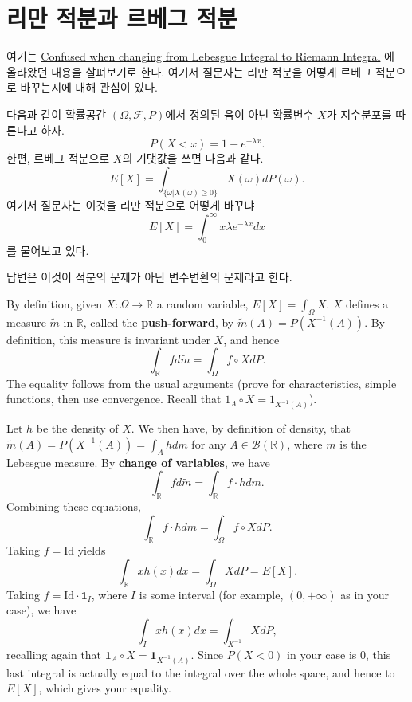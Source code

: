 \documentclass[
  13pt,
  letterpaper,
  DIV=11,
  numbers=noendperiod]{scrreprt}
\theoremstyle{definition}
\theoremstyle{plain}
\theoremstyle{definition}
\theoremstyle{plain}
\theoremstyle{plain}
\theoremstyle{definition}
\theoremstyle{remark}
\begin{document}
\section{리만 적분과 르베그
적분}\label{uxb9acuxb9cc-uxc801uxbd84uxacfc-uxb974uxbca0uxadf8-uxc801uxbd84}

여기는
\href{https://math.stackexchange.com/questions/2958787/confused-when-changing-from-lebesgue-integral-to-riemann-integral}{Confused
when changing from Lebesgue Integral to Riemann Integral} 에 올라왔던
내용을 살펴보기로 한다. 여기서 질문자는 리만 적분을 어떻게 르베그
적분으로 바꾸는지에 대해 관심이 있다.

다음과 같이 확률공간 \((\Omega, \mathcal{F}, P)\)에서 정의된 음이 아닌
확률변수 \(X\)가 지수분포를 따른다고 하자. \[
P(X<x) = 1-e^{-\lambda x}.
\] 한편, 르베그 적분으로 \(X\)의 기댓값을 쓰면 다음과 같다. \[
E[X] = \int_{\{\omega | X(\omega) \geq 0 \}} X(\omega) dP(\omega).
\] 여기서 질문자는 이것을 리만 적분으로 어떻게 바꾸냐 \[
E[X] = \int_0^\infty x \lambda e^{-\lambda x}dx
\] 를 물어보고 있다.

답변은 이것이 적분의 문제가 아닌 변수변환의 문제라고 한다.

By definition, given \(X: \Omega \rightarrow \mathbb{R}\) a random
variable, \(E[X] = \int_{\Omega} X\). \(X\) defines a measure
\(\tilde{m}\) in \(\mathbb{R}\), called the \textbf{push-forward}, by
\(\tilde{m}(A) = P(X^{-1}(A))\). By definition, this measure is
invariant under \(X\), and hence \[
\int_{\mathbb{R}} f d\tilde{m} = \int_{\Omega} f \circ X dP.
\] The equality follows from the usual arguments (prove for
characteristics, simple functions, then use convergence. Recall that
\(1_A \circ X = 1_{X^{-1}(A)}\)).

Let \(h\) be the density of \(X\). We then have, by definition of
density, that \(\tilde{m}(A) = P(X^{-1}(A)) = \int_A h dm\) for any
\(A \in \mathcal{B}(\mathbb{R})\), where \(m\) is the Lebesgue measure.
By \textbf{change of variables}, we have \[
\int_{\mathbb{R}}f d\tilde{m} = \int_{\mathbb{R}} f\cdot h dm.
\] Combining these equations, \[
\int_{\mathbb{R}} f \cdot h dm =\int_{\Omega} f \circ X dP.
\] Taking \(f=\text{Id}\) yields \[
\int_{\mathbb{R}}xh(x)dx = \int_{\Omega} X dP = E[X].
\] Taking \(f = \text{Id} \cdot \mathbf{1}_{I}\), where \(I\) is some
interval (for example, \((0, +\infty)\) as in your case), we have \[
\int_{I}xh(x)dx = \int_{X^{-1}}XdP,
\] recalling again that
\(\mathbf{1}_A \circ X = \mathbf{1}_{X^{-1}(A)}\). Since \(P(X<0)\) in
your case is \(0\), this last integral is actually equal to the integral
over the whole space, and hence to \(E[X]\), which gives your equality.
\end{document}

